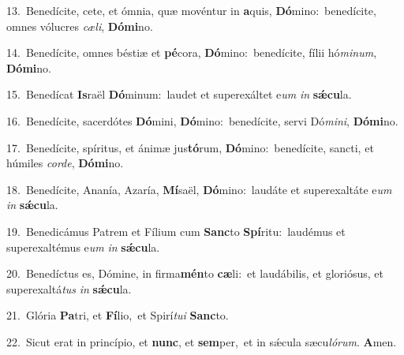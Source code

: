 {\numbfont\textcolor{\numbcolor}{13.}}~Benedícite, cete, et ómnia, quæ movéntur in \textbf{a}\-quis, \textbf{Dó}\-mino:~\star benedícite, omnes vólucres \textit{cæ}\-\textit{li}, \textbf{Dó}\-\textbf{mi}no.\par
{\numbfont\textcolor{\numbcolor}{14.}}~Benedícite, omnes béstiæ et \textbf{pé}\-cora, \textbf{Dó}\-mino:~\star benedícite, fílii hó\-\textit{mi}\-\textit{num}, \textbf{Dó}\-\textbf{mi}no.\par
{\numbfont\textcolor{\numbcolor}{15.}}~Benedícat \textbf{Is}\-raël \textbf{Dó}\-minum:~\star laudet et superexáltet e\textit{um} \textit{in} \textbf{sǽ}\-\textbf{cu}la.\par
{\numbfont\textcolor{\numbcolor}{16.}}~Benedícite, sacerdótes \textbf{Dó}\-mini, \textbf{Dó}\-mino:~\star benedícite, servi Dó\-\textit{mi}\-\textit{ni}, \textbf{Dó}\-\textbf{mi}no.\par
{\numbfont\textcolor{\numbcolor}{17.}}~Benedícite, spíritus, et ánimæ jus\-\textbf{tó}\-rum, \textbf{Dó}\-mino:~\star benedícite, sancti, et húmiles \textit{cor}\-\textit{de}, \textbf{Dó}\-\textbf{mi}no.\par
{\numbfont\textcolor{\numbcolor}{18.}}~Benedícite, Ananía, Azaría, \textbf{Mí}\-saël, \textbf{Dó}\-mino:~\star laudáte et superexaltáte e\textit{um} \textit{in} \textbf{sǽ}\-\textbf{cu}la.\par
{\numbfont\textcolor{\numbcolor}{19.}}~Benedicámus Patrem et Fílium cum \textbf{Sanc}\-to \textbf{Spí}\-ritu:~\star laudémus et superexaltémus e\textit{um} \textit{in} \textbf{sǽ}\-\textbf{cu}la.\par
{\numbfont\textcolor{\numbcolor}{20.}}~Benedíctus es, Dómine, in firma\-\textbf{mén}\-to \textbf{cæ}\-li:~\star et laudábilis, et gloriósus, et superexaltá\textit{tus} \textit{in} \textbf{sǽ}\-\textbf{cu}la.\par
{\numbfont\textcolor{\numbcolor}{21.}}~Glória \textbf{Pa}\-tri, et \textbf{Fí}\-lio,~\star et Spirí\-\textit{tu}\-\textit{i} \textbf{Sanc}\-to.\par
{\numbfont\textcolor{\numbcolor}{22.}}~Sicut erat in princípio, et \textbf{nunc}\-, et \textbf{sem}\-per,~\star et in sǽcula sæcu\-\textit{ló}\-\textit{rum}. \textbf{A}\-men.\par
